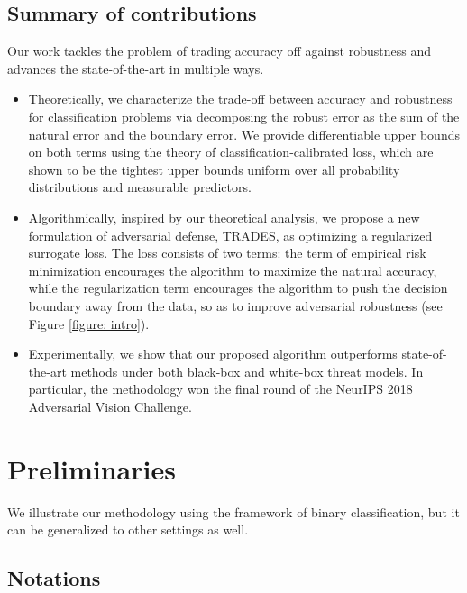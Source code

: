 \documentclass[11pt]{article}
\newcommand{\0}{\mathbf{0}}
\newcommand{\1}{\mathbf{1}}
\begin{document}
\subsection{Summary of contributions}
Our work tackles the problem of trading accuracy off against robustness and advances the state-of-the-art in multiple ways.
\vspace{-0.1cm}
\begin{itemize}
\item
Theoretically, we characterize the trade-off between accuracy and robustness for classification problems via decomposing the robust error as the sum of the natural error and the boundary error. We provide differentiable upper bounds on both terms using the theory of classification-calibrated loss, which are shown to be the tightest upper bounds uniform over all probability distributions and measurable predictors. 
\item
Algorithmically, inspired by our theoretical analysis, we propose a new formulation of adversarial defense, {TRADES}, as optimizing a regularized surrogate loss. The loss consists of two terms: the term of empirical risk minimization encourages the algorithm to maximize the natural accuracy, while the regularization term encourages the algorithm to push the decision boundary away from the data, so as to improve adversarial robustness (see Figure \ref{figure: intro}).
\item
Experimentally, we show that our proposed algorithm outperforms state-of-the-art methods under both black-box and white-box threat models. In particular, the methodology won the final round of the NeurIPS 2018 Adversarial Vision Challenge.
\end{itemize}







\section{Preliminaries}

We illustrate our methodology using the framework of binary classification, but it can be generalized to other settings as well. 

\subsection{Notations}
\end{document}
